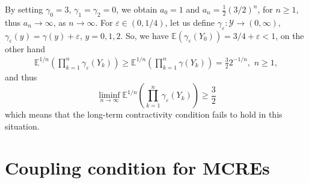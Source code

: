 \documentclass[a4paper,10pt]{article}
\newcommand{\Y}{\mathcal{Y}}
\newcommand{\E}{\mathbb{E}}
\newcommand{\eps}{\varepsilon}
\newcommand{\ga}{\gamma}
\begin{document}
By setting $\ga_0=3$, $\ga_1=\ga_2=0$, we obtain $a_0=1$ and $a_n=\frac{1}{2}(3/2)^n$, for $n\ge 1$, thus $a_n\to\infty$, as $n\to\infty$. For $\eps\in (0,1/4)$, let us define $\ga_\eps:\Y\to (0,\infty)$, $\ga_\eps (y)=\ga (y)+\eps$, $y=0,1,2$. So, we have $\E (\ga_{\eps} (Y_0))=3/4+\eps<1$, on the other hand
\begin{align*}
	\E^{1/n}\left(\prod_{k=1}^{n}\ga_\eps (Y_k)\right)\ge
	\E^{1/n}\left(\prod_{k=1}^{n}\ga (Y_k)\right)=\frac{3}{2}2^{-1/n},\,\,n\ge 1,
\end{align*}
and thus
$$
\liminf_{n\to\infty} \E^{1/n}\left(\prod_{k=1}^{n}\ga_\eps (Y_k)\right)\ge \frac{3}{2}
$$
which means that the long-term contractivity condition fails to hold in this situation.


\section{Coupling condition for MCREs}\label{ap:CouplingCondition}
\end{document}
